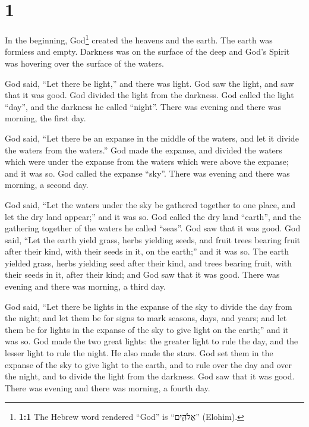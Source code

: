\hypertarget{section}{%
\section{1}\label{section}}

 In the beginning, God\footnote{\textbf{1:1} The Hebrew
  word rendered ``God'' is ``אֱלֹהִ֑ים'' (Elohim).} created the heavens
and the earth.  The earth was formless and empty. Darkness
was on the surface of the deep and God's Spirit was hovering over the
surface of the waters.

 God said, ``Let there be light,'' and there was light.
 God saw the light, and saw that it was good. God divided
the light from the darkness.  God called the light
``day'', and the darkness he called ``night''. There was evening and
there was morning, the first day.

 God said, ``Let there be an expanse in the middle of the
waters, and let it divide the waters from the waters.'' 
God made the expanse, and divided the waters which were under the
expanse from the waters which were above the expanse; and it was so.
 God called the expanse ``sky''. There was evening and
there was morning, a second day.

 God said, ``Let the waters under the sky be gathered
together to one place, and let the dry land appear;'' and it was so.
 God called the dry land ``earth'', and the gathering
together of the waters he called ``seas''. God saw that it was good.
 God said, ``Let the earth yield grass, herbs yielding
seeds, and fruit trees bearing fruit after their kind, with their seeds
in it, on the earth;'' and it was so.  The earth yielded
grass, herbs yielding seed after their kind, and trees bearing fruit,
with their seeds in it, after their kind; and God saw that it was good.
 There was evening and there was morning, a third day.

 God said, ``Let there be lights in the expanse of the
sky to divide the day from the night; and let them be for signs to mark
seasons, days, and years;  and let them be for lights in
the expanse of the sky to give light on the earth;'' and it was so.
 God made the two great lights: the greater light to rule
the day, and the lesser light to rule the night. He also made the stars.
 God set them in the expanse of the sky to give light to
the earth,  and to rule over the day and over the night,
and to divide the light from the darkness. God saw that it was good.
 There was evening and there was morning, a fourth day.

